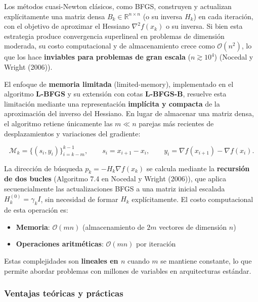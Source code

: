 \documentclass[
  spanish,
  us-letterpaper,
  DIV=11,
  numbers=noendperiod]{scrreprt}
\providecommand{\tightlist}{%
  \setlength{\itemsep}{0pt}\setlength{\parskip}{0pt}}
\numberwithin{equation}{section}
\begin{document}
Los métodos cuasi-Newton clásicos, como BFGS, construyen y actualizan
explícitamente una matriz densa \(B_k \in \mathbb{R}^{n \times n}\) (o
su inversa \(H_k\)) en cada iteración, con el objetivo de aproximar el
Hessiano \(\nabla^2 f(x_k)\) o su inversa. Si bien esta estrategia
produce convergencia superlineal en problemas de dimensión moderada, su
costo computacional y de almacenamiento crece como \(\mathcal{O}(n^2)\),
lo que los hace \textbf{inviables para problemas de gran escala}
(\(n \gtrsim 10^4\)) (Nocedal y Wright (2006)).

El enfoque de \textbf{memoria limitada} (limited-memory), implementado
en el algoritmo \textbf{L-BFGS} y su extensión con cotas
\textbf{L-BFGS-B}, resuelve esta limitación mediante una representación
\textbf{implícita y compacta} de la aproximación del inverso del
Hessiano. En lugar de almacenar una matriz densa, el algoritmo retiene
únicamente las \(m \ll n\) parejas más recientes de desplazamientos y
variaciones del gradiente:

\[
\mathcal{M}_k = \{ (s_i, y_i) \}_{i=k-m}^{k-1}, 
\qquad 
s_i = x_{i+1} - x_i, 
\qquad 
y_i = \nabla f(x_{i+1}) - \nabla f(x_i).
\tag{3.120}
\]

La dirección de búsqueda \(p_k = -H_k \nabla f(x_k)\) se calcula
mediante la \textbf{recursión de dos bucles} (Algoritmo 7.4 en Nocedal y
Wright (2006)), que aplica secuencialmente las actualizaciones BFGS a
una matriz inicial escalada \(H_k^{(0)} = \gamma_k I\), sin necesidad de
formar \(H_k\) explícitamente. El costo computacional de esta operación
es:

\begin{itemize}
\tightlist
\item
  \textbf{Memoria}: \(\mathcal{O}(mn)\) (almacenamiento de \(2m\)
  vectores de dimensión \(n\))\\
\item
  \textbf{Operaciones aritméticas}: \(\mathcal{O}(mn)\) por iteración
\end{itemize}

Estas complejidades son \textbf{lineales en \(n\)} cuando \(m\) se
mantiene constante, lo que permite abordar problemas con millones de
variables en arquitecturas estándar.

\subsubsection{Ventajas teóricas y
prácticas}\label{ventajas-teuxf3ricas-y-pruxe1cticas}
\end{document}
